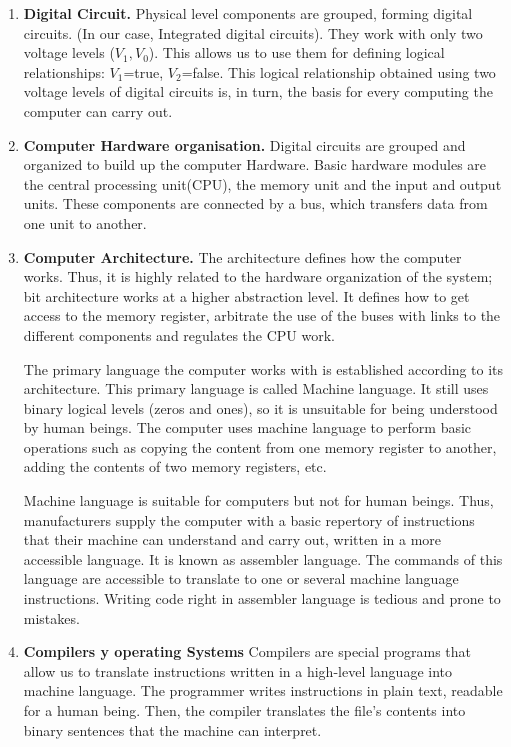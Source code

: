 \begin{paracol}{2}
\begin{enumerate}
\item \textbf{Digital Circuit.}
Physical level components are grouped, forming digital circuits. (In our case, Integrated digital circuits). They work with only two voltage levels ($V_1, V_0$). This allows us to use them for defining logical relationships: $V_1$=true, $V_2$=false. This logical relationship obtained using two voltage levels of digital circuits is, in turn, the basis for every computing the computer can carry out.

\item \textbf{Computer Hardware organisation.} 
Digital circuits are grouped and organized to build up the computer Hardware. Basic hardware modules are the central processing unit(CPU), the memory unit and the input and output units. These components are connected by a bus, which transfers data from one unit to another.

\item \textbf{Computer Architecture.} 
The architecture defines how the computer works. Thus, it is highly related to the hardware organization of the system; bit architecture works at a higher abstraction level. It defines how to get access to the memory register, arbitrate the use of the buses with links to the different components and regulates the CPU work.   
 
The primary language the computer works with is established according to its architecture. This primary language is called Machine language. It still uses binary logical levels (zeros and ones), so it is unsuitable for being understood by human beings. The computer uses machine language to perform basic operations such as copying the content from one memory register to another, adding the contents of two memory registers, etc.     

Machine language is suitable for computers but not for human beings. Thus, manufacturers supply the computer with a basic repertory of instructions that their machine can understand and carry out, written in a more accessible language. It is known as assembler language. The commands of this language are accessible to translate to one or several machine language instructions. Writing code right in assembler language is tedious and prone to mistakes.     
   
\item \textbf{Compilers y operating Systems}  
Compilers are special programs that allow us to translate instructions written in a high-level language into machine language. The programmer writes instructions in plain text, readable for a human being. Then, the compiler translates the file's contents into binary sentences that the machine can interpret.
       

\end{enumerate}
\end{paracol}
